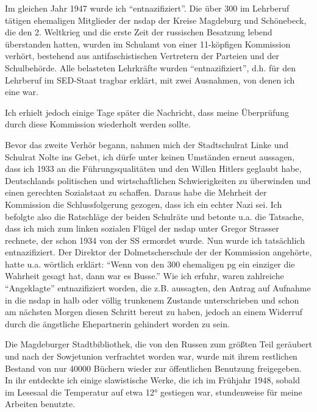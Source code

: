 \documentclass[a5paper,pagesize,10pt,twoside=true]{scrbook}
\renewcommand{\marginpar}[2][]{}
\begin{document}
Im gleichen Jahr 1947 wurde ich \enquote{entnazifiziert}. Die über 300 im Lehrberuf tätigen \marginpar{140} ehemaligen Mitglieder der \ac{nsdap} der Kreise Magdeburg und Schönebeck, die den 2. Weltkrieg und die erste Zeit der russischen Besatzung lebend überstanden hatten, wurden im Schulamt von einer 11-köpfigen Kommission verhört, bestehend aus antifaschistischen Vertretern der Parteien und der Schulbehörde. Alle belasteten Lehrkräfte wurden \enquote{entnazifiziert}, d.h. für den Lehrberuf im SED-Staat tragbar erklärt, mit zwei Ausnahmen, von denen ich eine war.

Ich erhielt jedoch einige Tage später die Nachricht, dass meine Überprüfung durch diese Kommission wiederholt werden sollte.

Bevor das zweite Verhör begann, nahmen mich der Stadtschulrat Linke und Schulrat Nolte ins Gebet, ich dürfe unter keinen Umständen erneut aussagen, dass ich 1933 an die Führungsqualitäten und den Willen Hitlers geglaubt habe, Deutschlands politischen und wirtschaftlichen Schwierigkeiten zu überwinden und einen gerechten Sozialstaat zu schaffen. Daraus habe die Mehrheit der Kommission die Schlussfolgerung gezogen, dass ich ein echter Nazi sei. Ich befolgte also die Ratschläge der beiden Schulräte und betonte u.a. die Tatsache, dass ich mich zum linken sozialen Flügel der \ac{nsdap} unter Gregor Strasser rechnete, der schon 1934 von der SS ermordet wurde. Nun wurde ich tatsächlich entnazifiziert. Der Direktor der Dolmetscherschule der der Kommission angehörte, hatte u.a. wörtlich erklärt: \enquote{Wenn von den 300 ehemaligen \ac{pg} ein einziger die Wahrheit gesagt hat, dann war es Busse.} Wie ich erfuhr, waren zahlreiche \enquote{Angeklagte} entnazifiziert worden, die z.B. aussagten, den Antrag auf Aufnahme in die \ac{nsdap} in halb oder völlig trunkenem Zustande unterschrieben und schon am nächsten Morgen diesen Schritt bereut zu haben, jedoch an einem Widerruf durch die ängstliche Ehepartnerin gehindert worden zu sein.

Die Magdeburger Stadtbibliothek, die von den Russen zum größten Teil geräubert und nach der Sowjetunion verfrachtet worden war, wurde mit ihrem restlichen Bestand von nur \num{40000} Büchern wieder zur öffentlichen Benutzung freigegeben. In ihr entdeckte ich einige slawistische Werke, die ich im Frühjahr 1948, sobald im Lesesaal die Temperatur auf etwa 12° gestiegen war, stundenweise für meine Arbeiten benutzte.
\end{document}
